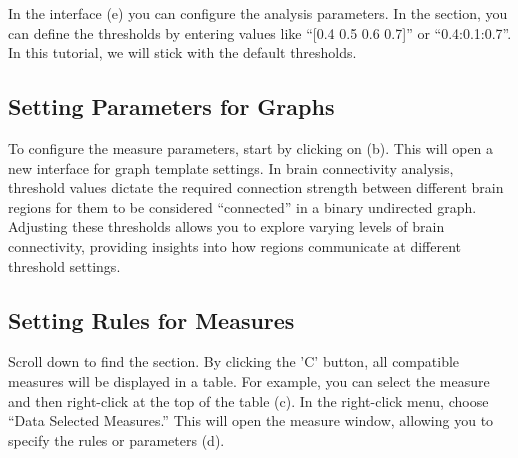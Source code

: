 \documentclass[justified]{tufte-handout}
\begin{document}
In the  interface (e) you can configure the analysis parameters.
In the  section, you can define the thresholds by entering values like ``[0.4 0.5 0.6 0.7]'' or ``0.4:0.1:0.7''. 
In this tutorial, we will stick with the default thresholds. 

\subsection{Setting Parameters for Graphs}

To configure the measure parameters, start by clicking on  (b). This will open a new interface for graph template settings. 
In brain connectivity analysis, threshold values dictate the required connection strength between different brain regions for them to be considered “connected” in a binary undirected graph. 
Adjusting these thresholds allows you to explore varying levels of brain connectivity, providing insights into how regions communicate at different threshold settings.

\subsection{Setting Rules for Measures}

Scroll down to find the  section. 
By clicking the 'C' button, all compatible measures will be displayed in a table. 
For example, you can select the  measure and then right-click at the top of the table (c). 
In the right-click menu, choose “Data Selected Measures.” 
This will open the measure window, allowing you to specify the rules or parameters (d).
\end{document}
